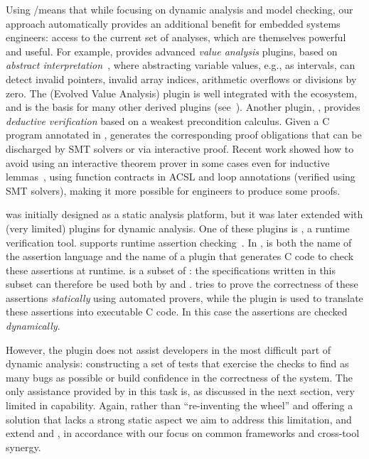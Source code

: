 Using \acsl/\framac means that while focusing on dynamic analysis and model checking, our approach automatically provides an additional benefit for embedded systems engineers: access to the current set of \framac analyses, which are themselves powerful and useful.  For example, \framac provides advanced \emph{value analysis} plugins, based on \emph{abstract interpretation}~\cite{cousot77}, where abstracting variable values, e.g., as intervals, can detect invalid pointers, invalid array indices, arithmetic overflows or divisions by zero.  The \Eva (Evolved Value Analysis) plugin is well integrated with the \framac ecosystem, 
and is the basis for many other derived plugins (see~\cite{KKP2015:FAC}).
Another \framac plugin, \Wp, provides \emph{deductive verification} based on a weakest precondition calculus.
Given a C program annotated in \acsl, \Wp generates the corresponding proof obligations that can be discharged by SMT solvers or via interactive proof.
Recent work  showed how to avoid using an interactive theorem prover in some cases even for inductive lemmas~\cite{BLK2019:NFM}, using 
function contracts in ACSL and loop annotations (verified using SMT solvers), making it more possible for engineers to produce some proofs.

\framac was initially designed as a static analysis platform, but it was later extended with (very limited) plugins for dynamic analysis.
One of these plugins is \eacsl, a runtime verification tool.
\eacsl supports runtime assertion checking~\cite{CR2006:SEN}.
In \framac, \eacsl is both the name of the assertion language and the name of a plugin that generates C code to check these assertions at runtime.
\eacsl is a subset of \acsl: the specifications written in this subset can therefore be used both by \Wp and \eacsl.
\Wp tries to prove the correctness of these assertions {\em statically} using automated provers, while the plugin \eacsl is used to translate these assertions into executable C code.
In this case the assertions are checked {\em dynamically}.

However, the \eacsl plugin does not assist developers in the most difficult part of dynamic analysis:  constructing a set of tests that exercise the checks to find as many bugs as possible or build confidence in the correctness of the system.  The only assistance provided by \framac in this task is, as discussed in the next section, very limited in capability.  Again, rather than ``re-inventing the wheel'' and offering a solution that lacks a strong static aspect we aim to address this limitation, and extend \acsl and \eacsl, in accordance with our focus on common frameworks and cross-tool synergy. 